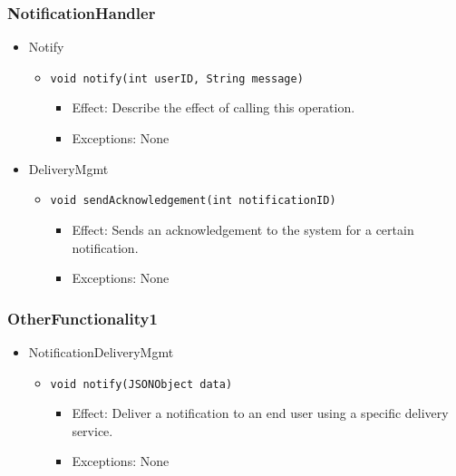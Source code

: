     \subsubsection{NotificationHandler}
    \begin{itemize}
        \item Notify
        \begin{itemize}
            \item \texttt{void notify(int userID, String message)}
            \begin{itemize}
                \item Effect: Describe the effect of calling this operation.
                \item Exceptions: None
            \end{itemize}
        \end{itemize}
        \item DeliveryMgmt
        \begin{itemize}
            \item \texttt{void sendAcknowledgement(int notificationID)}
            \begin{itemize}
                \item Effect: Sends an acknowledgement to the system for a certain notification.
                \item Exceptions: None
            \end{itemize}
        \end{itemize}
    \end{itemize}

    \subsubsection{OtherFunctionality1}
    \begin{itemize}
        \item NotificationDeliveryMgmt
        \begin{itemize}
            \item \texttt{void notify(JSONObject data)}
            \begin{itemize}
                \item Effect: Deliver a notification to an end user using a specific delivery service.
                \item Exceptions: None
            \end{itemize}
        \end{itemize}
    \end{itemize}

